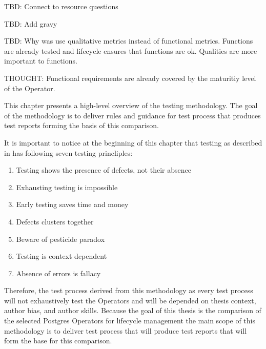 TBD: Connect to resource questions

TBD: Add gravy

TBD: Why was use qualitative metrics instead of functional metrics. Functions are already tested and lifecycle ensures that functions are ok. Qualities are more important to functions.

THOUGHT: Functional requirements are already covered by the maturitiy level of the Operator.






This chapter presents a high-level overview of the testing methodology. The goal of the methodology is to deliver rules and guidance for test process that produces test reports forming the basis of this comparison.

It is important to notice at the beginning of this chapter that testing as described in \cite{FoundationOfSoftwareTesting} has following seven testing princliples:
\begin{enumerate}
  \item Testing shows the presence of defects, not their absence
  \item Exhausting testing is impossible
  \item Early testing saves time and money
  \item Defects clusters together
  \item Beware of pesticide paradox
  \item Testing is context dependent
  \item Absence of errors is fallacy
\end{enumerate}



Therefore, the test process derived from this methodology as every test process will not exhaustively test the Operators and will be depended on thesis context, author bias, and author skills. Because the goal of this thesis is the comparison of the selected Postgres Operators for lifecycle management the main scope of this methodology is to deliver test process that will produce test reports that will form the base for this comparison.

